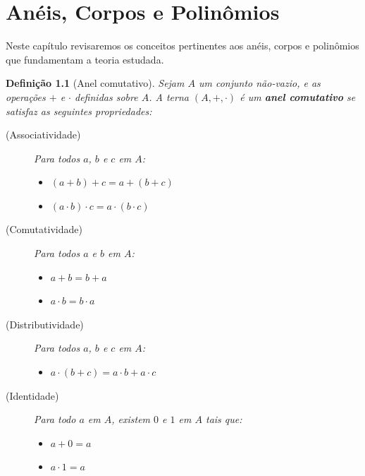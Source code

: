 \documentclass[12pt,a4paper]{report}
\newtheorem{definition}[theorem]{Definição}
\numberwithin{theorem}{chapter}
\begin{document}


\chapter{Anéis, Corpos e Polinômios}

Neste capítulo revisaremos os conceitos pertinentes aos anéis, corpos
e polinômios que fundamentam a teoria estudada.

\begin{definition}[Anel comutativo]
  Sejam \(A\) um conjunto não-vazio, e as operações \(+\) e \(\cdot\)
  definidas sobre \(A\).  A terna \((A,+,\cdot)\) é um \textbf{anel
    comutativo} se satisfaz as seguintes propriedades:

  \begin{description}
  \item[(Associatividade)] Para todos \(a\), \(b\) e \(c\) em \(A\):
    \begin{itemize}
    \item \((a + b) + c = a + ( b + c)\)
    \item \((a \cdot b) \cdot c = a \cdot (b \cdot c)\)
    \end{itemize}

  \item[(Comutatividade)] Para todos \(a\) e \(b\) em \(A\):
    \begin{itemize}
    \item \(a + b = b + a\)
    \item \(a \cdot b = b \cdot a\)
    \end{itemize}

  \item[(Distributividade)] Para todos \(a\), \(b\) e \(c\) em \(A\):
    \begin{itemize}
    \item \(a \cdot (b + c) = a \cdot b + a \cdot c\)
    \end{itemize}

  \item[(Identidade)] Para todo \(a\) em \(A\), existem \(0\) e \(1\)
    em \(A\) tais que:
    \begin{itemize}
    \item \(a + 0 = a\)
    \item \(a \cdot 1 = a\)
    \end{itemize}

  \end{description}
\end{definition}
\end{document}

